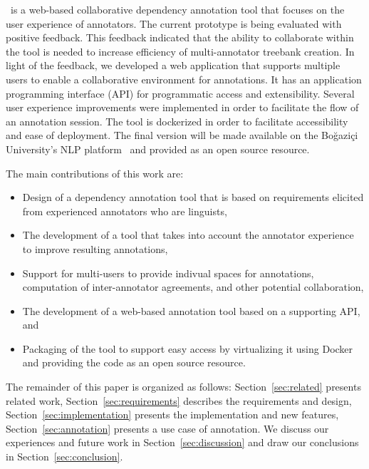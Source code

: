 \boatvtwo\ is a web-based collaborative dependency annotation tool that focuses on the user experience of annotators.
The current prototype is being evaluated with positive feedback.
This feedback indicated that the ability to collaborate within the tool is needed to increase efficiency of multi-annotator treebank creation.
In light of the feedback, we developed a web application that supports multiple users to enable a collaborative environment for annotations.
It has an application programming interface (API) for programmatic access and extensibility.
Several user experience improvements were implemented in order to facilitate the flow of an annotation session.
The tool is dockerized in order to facilitate accessibility and ease of deployment.
The final version will be made available on the Boğaziçi University's NLP platform~\cite{DIP} and provided as an open source resource.

The main contributions of this work are:
\begin{itemize}
\setlength\itemsep{0em}
        \item Design of a dependency annotation tool that is based on requirements elicited from experienced annotators who are linguists,
        \item The development of a tool that takes into account the annotator experience to improve resulting annotations,
        \item Support for multi-users to provide indivual spaces for annotations, computation of inter-annotator agreements, and other potential collaboration,
        \item The development of a web-based annotation tool based on a supporting API, and
        \item Packaging of the tool to support easy access by virtualizing it using Docker and providing the code as an open source resource.
\end{itemize}

The remainder of this paper is organized as follows:
Section~\ref{sec:related} presents related work,
Section~\ref{sec:requirements} describes the requirements and design,
Section~\ref{sec:implementation} presents the implementation and new features,
Section~\ref{sec:annotation} presents a use case of annotation.
We discuss our experiences and future work in Section~\ref{sec:discussion} and draw our conclusions in Section~\ref{sec:conclusion}.
